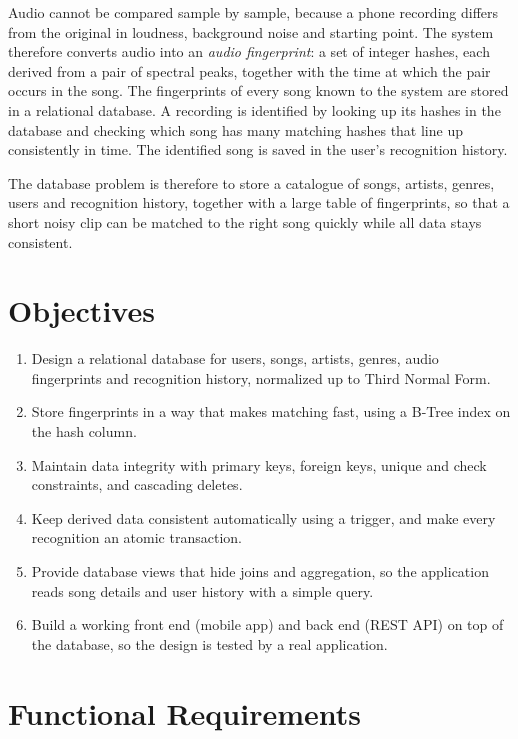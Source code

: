 \documentclass[11pt,a4paper]{article}
\begin{document}
Audio cannot be compared sample by sample, because a phone recording differs from the original in loudness, background noise and starting point. The system therefore converts audio into an \emph{audio fingerprint}: a set of integer hashes, each derived from a pair of spectral peaks, together with the time at which the pair occurs in the song. The fingerprints of every song known to the system are stored in a relational database. A recording is identified by looking up its hashes in the database and checking which song has many matching hashes that line up consistently in time. The identified song is saved in the user's recognition history.

The database problem is therefore to store a catalogue of songs, artists, genres, users and recognition history, together with a large table of fingerprints, so that a short noisy clip can be matched to the right song quickly while all data stays consistent.

\section{Objectives}

\begin{enumerate}
  \item Design a relational database for users, songs, artists, genres, audio fingerprints and recognition history, normalized up to Third Normal Form.
  \item Store fingerprints in a way that makes matching fast, using a B-Tree index on the hash column.
  \item Maintain data integrity with primary keys, foreign keys, unique and check constraints, and cascading deletes.
  \item Keep derived data consistent automatically using a trigger, and make every recognition an atomic transaction.
  \item Provide database views that hide joins and aggregation, so the application reads song details and user history with a simple query.
  \item Build a working front end (mobile app) and back end (REST API) on top of the database, so the design is tested by a real application.
\end{enumerate}

\section{Functional Requirements}
\end{document}

